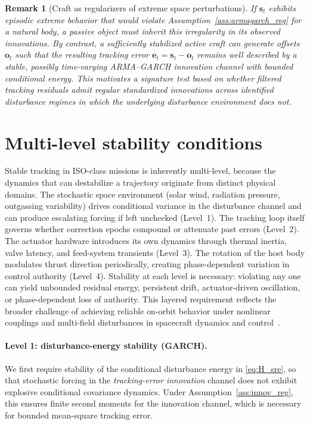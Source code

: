 \documentclass{article}
\newtheorem{remark}{Remark}
\begin{document}
\begin{remark}[Craft as regularizers of extreme space perturbations]
\label{rem:regularization_test}
If $\mathbf{s}_t$ exhibits episodic extreme behavior that would violate Assumption~\ref{ass:armagarch_reg} for a natural body, a passive object must inherit this
irregularity in its observed innovations. By contrast, a sufficiently stabilized active craft can generate offsets $\mathbf{o}_t$ such that the resulting tracking
error $\mathbf{e}_t=\mathbf{s}_t-\mathbf{o}_t$ remains well described by a stable, possibly time-varying ARMA--GARCH innovation channel with bounded conditional energy.
This motivates a signature test based on whether filtered tracking residuals admit regular standardized innovations across identified disturbance regimes in which the underlying disturbance environment does not.
\end{remark}



\section{Multi-level stability conditions}
\label{sec:stability}

Stable tracking in ISO-class missions is inherently multi-level, because the dynamics that can destabilize a trajectory originate from distinct physical domains. The stochastic space environment (solar wind, radiation pressure, outgassing variability) drives conditional variance in the disturbance channel and can produce escalating forcing if left unchecked (Level~1). The tracking loop itself governs whether correction epochs compound or attenuate past errors (Level~2). The actuator hardware introduces its own dynamics through thermal inertia, valve latency, and feed-system transients (Level~3). The rotation of the host body modulates thrust direction periodically, creating phase-dependent variation in control authority (Level~4). Stability at each level is necessary: violating any one can yield unbounded residual energy, persistent drift, actuator-driven oscillation, or phase-dependent loss of authority. This layered requirement reflects the broader challenge of achieving reliable on-orbit behavior under nonlinear couplings and multi-field disturbances in spacecraft dynamics and control~\cite{zhang2024advances_sdc}.




\paragraph{Level 1: disturbance-energy stability (GARCH).}
We first require stability of the conditional disturbance energy in \eqref{eq:H_sre}, so that stochastic forcing in the \emph{tracking-error innovation} channel does not exhibit explosive conditional covariance dynamics. Under Assumption~\ref{ass:innov_reg}, this ensures finite second moments for the innovation channel, which is necessary for bounded mean-square tracking error.
\end{document}
